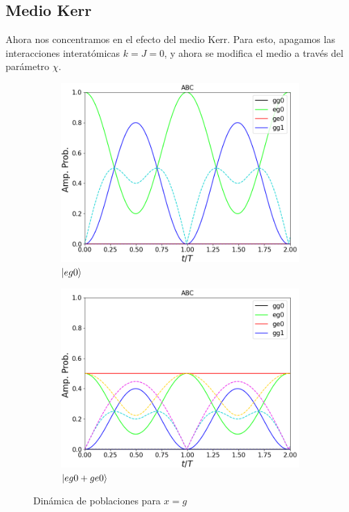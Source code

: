 \subsection{Medio Kerr}
\label{sec4:medio kerr}
Ahora nos concentramos en el efecto del medio Kerr. Para esto, apagamos las interacciones interatómicas $k=J=0$, y ahora se modifica el medio a través del parámetro $\chi$. 
\begin{figure}[h]
    \centering
    \begin{subfigure}{0.49\textwidth}
        \includegraphics[width=\textwidth]{figuras/ch4/x eg0 abc.png}
        \caption{$\ket{eg0}$}
        \label{fig4:pob x eg0}
    \end{subfigure}
    \hfill
    \begin{subfigure}{0.49\textwidth}
        \includegraphics[width=\textwidth]{figuras/ch4/x eg0+ abc.png}
        \caption{$\ket{eg0+ge0}$}
        \label{fig4:pob x eg0 sim}
    \end{subfigure}
    \caption{Dinámica de poblaciones para $x=g$}
    \label{fig4:pob x}
\end{figure}


